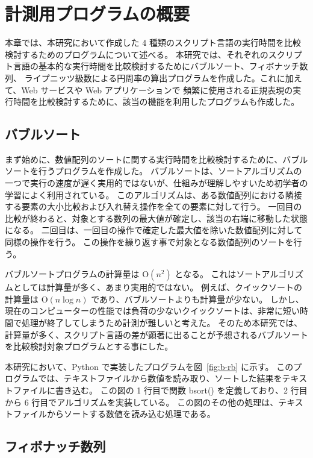 \chapter{計測用プログラムの概要}
\label{cha:program}

本章では、本研究において作成した 4 種類のスクリプト言語の実行時間を比較検討するためのプログラムについて述べる。 
本研究では、それぞれのスクリプト言語の基本的な実行時間を比較検討するためにバブルソート、フィボナッチ数列、
ライプニッツ級数による円周率の算出プログラムを作成した。これに加えて、Web サービスや Web アプリケーションで
頻繁に使用される正規表現の実行時間を比較検討するために、該当の機能を利用したプログラムも作成した。

\section{バブルソート}
\label{cha:program:sort}

まず始めに、数値配列のソートに関する実行時間を比較検討するために、バブルソートを行うプログラムを作成した。
バブルソートは、ソートアルゴリズムの一つで実行の速度が遅く実用的ではないが、仕組みが理解しやすいため初学者の学習によく利用されている。
このアルゴリズムは、ある数値配列における隣接する要素の大小比較および入れ替え操作を全ての要素に対して行う。
一回目の比較が終わると、対象とする数列の最大値が確定し、該当の右端に移動した状態になる。
二回目は、一回目の操作で確定した最大値を除いた数値配列に対して同様の操作を行う。
この操作を繰り返す事で対象となる数値配列のソートを行う。

バブルソートプログラムの計算量は O$(n^{2})$ となる。
これはソートアルゴリズムとしては計算量が多く、あまり実用的ではない。
例えば、クイックソートの計算量は O$(n\log{n})$ であり、バブルソートよりも計算量が少ない。
しかし、現在のコンピューターの性能では負荷の少ないクイックソートは、非常に短い時間で処理が終了してしまうため計測が難しいと考えた。
そのため本研究では、計算量が多く、スクリプト言語の差が顕著に出ることが予想されるバブルソートを比較検討対象プログラムとする事にした。

本研究において、Python で実装したプログラムを図~\ref{fig:b-rb} に示す。
このプログラムでは、テキストファイルから数値を読み取り、ソートした結果をテキストファイルに書き込む。
この図の 1 行目で関数 bsort() を定義しており、2 行目から 6 行目でアルゴリズムを実装している。
この図のその他の処理は、テキストファイルからソートする数値を読み込む処理である。

\section{フィボナッチ数列}
\label{cha:program:fibonacci}

